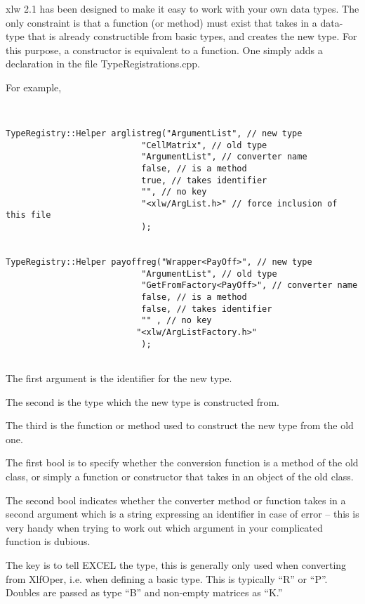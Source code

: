 \documentclass[12pt,reqno]{amsart}
\numberwithin{equation}{section}
\numberwithin{figure}{section}
\begin{document}
xlw 2.1 has been designed to make it easy to work with your own data
types. The only constraint is that a function (or method) must exist
that takes in a data-type that is already constructible from basic
types, and creates the new type. For this purpose, a constructor is
equivalent to a function. One simply adds a declaration in the file
TypeRegistrations.cpp. 

For example,
\begin{verbatim}


TypeRegistry::Helper arglistreg("ArgumentList", // new type
                           "CellMatrix", // old type
                           "ArgumentList", // converter name
                           false, // is a method
                           true, // takes identifier 
                           "", // no key
                           "<xlw/ArgList.h>" // force inclusion of this file
                           );


TypeRegistry::Helper payoffreg("Wrapper<PayOff>", // new type
                           "ArgumentList", // old type
                           "GetFromFactory<PayOff>", // converter name
                           false, // is a method
                           false, // takes identifier 
                           "" , // no key
                          "<xlw/ArgListFactory.h>"
                           );


\end{verbatim}

The first argument is the identifier for the new type.

The second is the type which the new type is constructed from. 

The third is the function or method used to construct the new type
from the old one. 

The first bool is to specify whether the conversion function is a
method of the old class, or simply a function or constructor that
takes in an object of the old class. 

The second bool indicates whether the converter method or function
takes in a second argument which is a string expressing an identifier
in case of error -- this is very handy when trying to work out which
argument in your complicated function is dubious. 

The key is to tell EXCEL the type, this is generally only used when converting
from XlfOper, i.e. when defining a basic type. This is typically ``R''
or ``P''. Doubles are passed as type ``B'' and non-empty matrices as ``K.''
\end{document}
